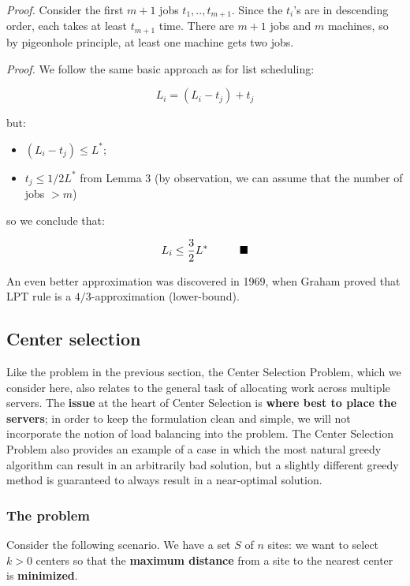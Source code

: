 
\textit{Proof.} Consider the first $m+1$ jobs $t_1,.., t_{m+1}$. Since the $t_i$'s are in descending order, each takes at least $t_{m+1}$ time.
There are $m+1$ jobs and $m$ machines, so by pigeonhole principle, at least one machine gets two jobs.


\textit{Proof.} We follow the same basic approach as for list scheduling:

$$
L_i = (L_i - t_j) + t_j
$$

but:

\begin{itemize}
    \item $(L_i - t_j) \leq L^*$;
    \item $t_j \leq 1/2L^*$ from Lemma 3 (by observation, we can assume that the number of jobs $> m$)
\end{itemize}

so we conclude that:

$$
L_i \leq \frac{3}{2} L^* \hspace{10mm} \blacksquare
$$

An even better approximation was discovered in 1969, when Graham proved that LPT rule is a $4/3$-approximation (lower-bound).

\subsection{Center selection}
Like the problem in the previous section, the Center Selection Problem, which we consider here, also relates to the general task of allocating work across multiple servers. The \textbf{issue} at the heart of Center Selection is \textbf{where best to place the servers}; in order to keep the formulation clean and simple, we will not incorporate the notion of load balancing into the problem. The Center Selection Problem also provides an example of a case in which the most natural greedy algorithm can result in an arbitrarily bad solution, but a slightly different greedy method is guaranteed to always result in a near-optimal solution.

\subsubsection{The problem}
Consider the following scenario. We have a set $S$ of $n$ sites: we want to select $k>0$ centers so that the \textbf{maximum distance} from a site to the nearest center is \textbf{minimized}. 

